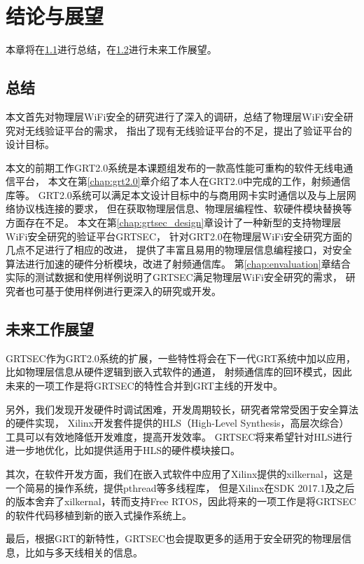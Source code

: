 
\chapter{结论与展望}\label{chap:conclusion}
本章将在\ref{sec:conclusion}进行总结，在\ref{sec:future_work}进行未来工作展望。

  \section{总结}\label{sec:conclusion}
  本文首先对物理层WiFi安全的研究进行了深入的调研，总结了物理层WiFi安全研究对无线验证平台的需求，
  指出了现有无线验证平台的不足，提出了验证平台的设计目标。

  本文的前期工作GRT2.0系统是本课题组发布的一款高性能可重构的软件无线电通信平台，
  本文在第\ref{chap:grt2.0}章介绍了本人在GRT2.0中完成的工作，射频通信库等。
  GRT2.0系统可以满足本文设计目标中的与商用网卡实时通信以及与上层网络协议栈连接的要求，
	但在获取物理层信息、物理层编程性、软硬件模块替换等方面存在不足。
  本文在第\ref{chap:grtsec_design}章设计了一种新型的支持物理层WiFi安全研究的验证平台GRTSEC，
  针对GRT2.0在物理层WiFi安全研究方面的几点不足进行了相应的改进，
  提供了丰富且易用的物理层信息编程接口，对安全算法进行加速的硬件分析模块，改进了射频通信库。
  第\ref{chap:envaluation}章结合实际的测试数据和使用样例说明了GRTSEC满足物理层WiFi安全研究的需求，
  研究者也可基于使用样例进行更深入的研究或开发。

  \section{未来工作展望}\label{sec:future_work}
  GRTSEC作为GRT2.0系统的扩展，一些特性将会在下一代GRT系统中加以应用，比如物理层信息从硬件逻辑到嵌入式软件的通道，
  射频通信库的回环模式，因此未来的一项工作是将GRTSEC的特性合并到GRT主线的开发中。

  另外，我们发现开发硬件时调试困难，开发周期较长，研究者常常受困于安全算法的硬件实现，
  Xilinx开发套件提供的HLS（High-Level Synthesis，高层次综合）\cite{xilinxhls}工具可以有效地降低开发难度，提高开发效率。
  GRTSEC将来希望针对HLS进行进一步地优化，比如提供适用于HLS的硬件模块接口。

  其次，在软件开发方面，我们在嵌入式软件中应用了Xilinx提供的xilkernal，这是一个简易的操作系统，提供pthread等多线程库，
  但是Xilinx在SDK 2017.1及之后的版本舍弃了xilkernal，转而支持Free RTOS，因此将来的一项工作是将GRTSEC的软件代码移植到新的嵌入式操作系统上。

  最后，根据GRT的新特性，GRTSEC也会提取更多的适用于安全研究的物理层信息，比如与多天线相关的信息。
